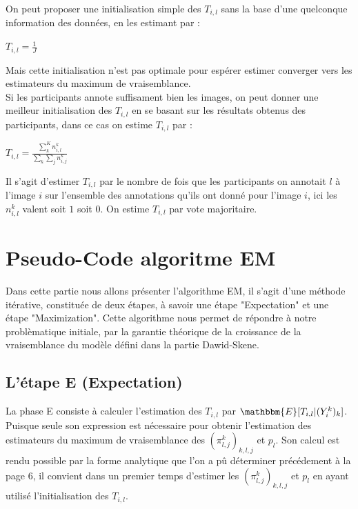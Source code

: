 \documentclass[frenchb]{report}
\newcommand{\1}{\mathbbm{1}}
\newcommand{\E}{\mathbbm{E}}
\theoremstyle{definition}\newtheorem{defn}{Définition}
\theoremstyle{definition}\newtheorem{exm}{Exemple}
\theoremstyle{definition}\newtheorem{nota}{Notation}
\theoremstyle{definition}\newtheorem{rem}{Remarque}
\begin{document}
On peut proposer une initialisation simple des  $T_{i,l}$ sans la base d'une quelconque information des données, en les estimant par : 

\begin{center}
	$T_{i,l} = \displaystyle \frac{1}{J}$
\end{center}

Mais cette initialisation n'est pas optimale pour espérer estimer converger vers les estimateurs du maximum de vraisemblance.\\

Si les participants annote suffisament bien les images, on peut donner une meilleur initialisation des $T_{i,l}$ en se basant sur les résultats obtenus des participants, dans ce cas on estime $T_{i,l}$ par : 

\begin{center}
	 $T_{i,l} = \displaystyle \frac{ \displaystyle \sum_k^K n_{i,l}^k}{\displaystyle \sum_k \displaystyle \sum_j n_{i,j}^k}$
\end{center}

Il s'agit d'estimer $T_{i,l}$ par le nombre de fois que les participants on annotait $l$ à l'image $i$ sur l'ensemble des annotations qu'ils ont donné pour l'image $i$, ici les $n_{i,l}^k$ valent soit $1$ soit $0$. On estime $T_{i,l}$ par vote majoritaire.

\chapter{Pseudo-Code algoritme EM}

Dans cette partie nous allons présenter l'algorithme EM, il s'agit d'une méthode itérative, constituée de deux étapes, à savoir une étape "Expectation" et une étape "Maximization". Cette algorithme nous permet de répondre à notre problèmatique initiale, par la garantie théorique de la croissance de la vraisemblance du modèle défini dans la partie Dawid-Skene.

\section{L'étape E (Expectation)}

La phase E consiste à calculer l'estimation des $T_{i,l}$ par $\E[T_{i,l}|(Y^k_i)_k]$.\\
Puisque seule son expression est nécessaire pour obtenir l'estimation des estimateurs du maximum de vraisemblance des $(\pi^k_{l,j})_{k,l,j}$ et $p_l$. Son calcul est rendu possible par la forme analytique que l'on a pû déterminer précédement à la page $6$, il convient dans un premier temps d'estimer les $(\pi^k_{l,j})_{k,l,j}$ et $p_l$ en ayant utilisé l'initialisation des $T_{i,l}$.
\end{document}
